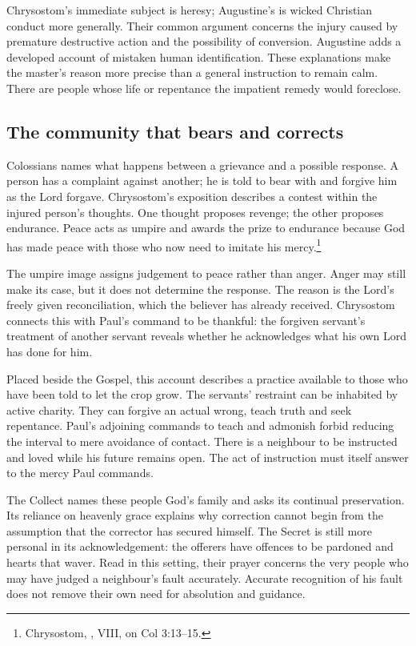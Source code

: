 Chrysostom's immediate subject is heresy; Augustine's is wicked Christian
conduct more generally. Their common argument concerns the injury caused
by premature destructive action and the possibility of conversion.
Augustine adds a developed account of mistaken human identification.
These explanations make the master's reason more precise than a general
instruction to remain calm. There are people whose life or repentance
the impatient remedy would foreclose.

\subsection{The community that bears and corrects}
Colossians names what happens between a grievance and a possible response.
A person has a complaint against another; he is told to bear with and
forgive him as the Lord forgave. Chrysostom's exposition describes a
contest within the injured person's thoughts. One thought proposes
revenge; the other proposes endurance. Peace acts as umpire and awards
the prize to endurance because God has made peace with those who now
need to imitate his mercy.\footnote{Chrysostom, , VIII, on Col 3:13--15.}

The umpire image assigns judgement to peace rather than anger. Anger
may still make its case, but it does not determine the response. The
reason is the Lord's freely given reconciliation, which the believer
has already received. Chrysostom connects this with Paul's command to
be thankful: the forgiven servant's treatment of another servant reveals
whether he acknowledges what his own Lord has done for him.

Placed beside the Gospel, this account describes a practice available
to those who have been told to let the crop grow. The servants' restraint
can be inhabited by active charity. They can forgive an actual wrong,
teach truth and seek repentance. Paul's adjoining commands to teach
and admonish forbid reducing the interval to mere avoidance of contact.
There is a neighbour to be instructed and loved while his future remains
open. The act of instruction must itself answer to the mercy Paul
commands.

The Collect names these people God's family and asks its continual
preservation. Its reliance on heavenly grace explains why correction
cannot begin from the assumption that the corrector has secured himself.
The Secret is still more personal in its acknowledgement: the offerers
have offences to be pardoned and hearts that waver. Read in this setting,
their prayer concerns the very people who may have judged a neighbour's
fault accurately. Accurate recognition of his fault does not remove
their own need for absolution and guidance.

